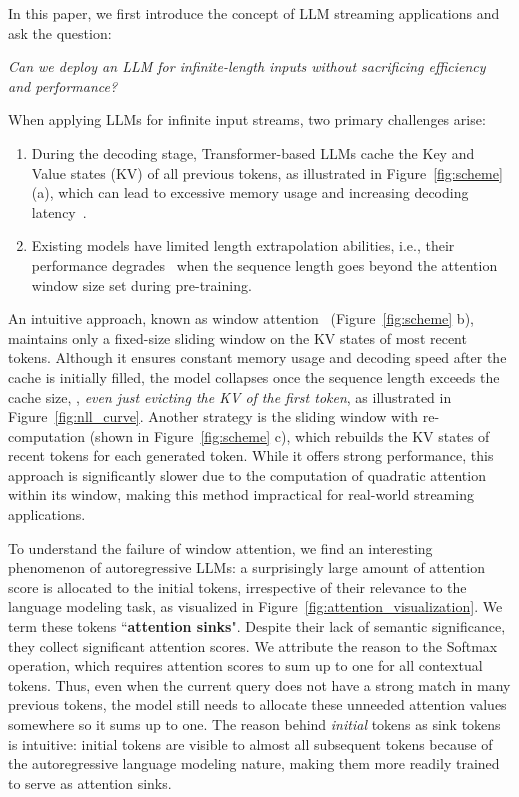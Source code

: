 In this paper, we first introduce the concept of LLM streaming applications and ask the question: 
\begin{center}
   \emph{Can we deploy an LLM for infinite-length inputs without sacrificing efficiency and performance?} 
\end{center}
When applying LLMs for infinite input streams, two primary challenges arise:
\vspace{-0.5em}
\begin{enumerate}
    \item During the decoding stage, Transformer-based LLMs cache the Key and Value states (KV) of all previous tokens, as illustrated in Figure~\ref{fig:scheme} (a), which can lead to excessive memory usage and increasing decoding latency~\citep{pope2022efficiently}.
    \item Existing models have limited length extrapolation abilities, i.e., their performance degrades~\citep{alibi,chen2023extending} when the sequence length goes beyond the attention window size set during pre-training.
\end{enumerate}
\vspace{-0.5em}
An intuitive approach, known as window attention~\citep{beltagy2020longformer} (Figure~\ref{fig:scheme} b), maintains only a fixed-size sliding window on the KV states of most recent tokens. Although it ensures constant memory usage and decoding speed after the cache is initially filled, the model collapses once the sequence length exceeds the cache size, \ie, \emph{even just evicting the KV of the first token}, as illustrated in Figure~\ref{fig:nll_curve}.
Another strategy is the sliding window with re-computation (shown in Figure~\ref{fig:scheme} c), which rebuilds the KV states of recent tokens for each generated token. While it offers strong performance, this approach is significantly slower due to the computation of quadratic attention within its window, making this method impractical for real-world streaming applications.


To understand the failure of window attention, we find an interesting phenomenon of autoregressive LLMs: a surprisingly large amount of attention score is allocated to the initial tokens, irrespective of their relevance to the language modeling task, as visualized in Figure~\ref{fig:attention_visualization}. We term these tokens ``\textbf{attention sinks}". 
Despite their lack of semantic significance, they collect significant attention scores. We attribute the reason to the Softmax operation, which requires attention scores to sum up to one for all contextual tokens. Thus, even when the current query does not have a strong match in many previous tokens, the model still needs to allocate these unneeded attention values somewhere so it sums up to one. The reason behind \textit{initial} tokens as sink tokens is intuitive: initial tokens are visible to almost all subsequent tokens because of the autoregressive language modeling nature, making them more readily trained to serve as attention sinks.

